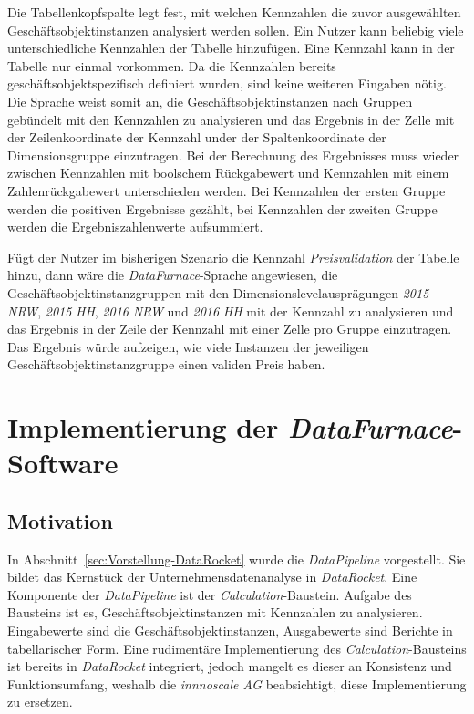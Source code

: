 \documentclass[
  language=german, %
  type=bachelor%
]{isthesis}
\begin{document}
\begin{content}
  Die Tabellenkopfspalte legt fest, mit welchen Kennzahlen die zuvor
  ausgewählten Geschäftsobjektinstanzen analysiert werden sollen. Ein Nutzer
  kann beliebig viele unterschiedliche Kennzahlen der Tabelle hinzufügen. Eine
  Kennzahl kann in der Tabelle nur einmal vorkommen. Da die Kennzahlen bereits
  geschäftsobjektspezifisch definiert wurden, sind keine weiteren Eingaben
  nötig. Die Sprache weist somit an, die Geschäftsobjektinstanzen nach Gruppen
  gebündelt mit den Kennzahlen zu analysieren und das Ergebnis in der Zelle mit
  der Zeilenkoordinate der Kennzahl under der Spaltenkoordinate der
  Dimensionsgruppe einzutragen. Bei der Berechnung des Ergebnisses muss wieder
  zwischen Kennzahlen mit boolschem Rückgabewert und Kennzahlen mit einem
  Zahlenrückgabewert unterschieden werden. Bei Kennzahlen der ersten
  Gruppe werden die positiven Ergebnisse gezählt, bei Kennzahlen der zweiten
  Gruppe werden die Ergebniszahlenwerte aufsummiert.
  
  Fügt der Nutzer im bisherigen Szenario die
  Kennzahl \textit{Preisvalidation} der Tabelle hinzu, dann wäre die
  \textit{DataFurnace}-Sprache angewiesen, die Geschäftsobjektinstanzgruppen
  mit den Dimensionslevelausprägungen \textit{2015} \textit{NRW}, \textit{2015}
  \textit{HH}, \textit{2016} \textit{NRW} und \textit{2016} \textit{HH} mit der
  Kennzahl zu analysieren und das Ergebnis in der Zeile der Kennzahl mit einer
  Zelle pro Gruppe einzutragen. Das Ergebnis würde aufzeigen, wie viele Instanzen der
  jeweiligen Geschäftsobjektinstanzgruppe einen validen Preis haben.



  \chapter{Implementierung der \textit{DataFurnace}-Software}

  \section{Motivation}
  In Abschnitt~\ref{sec:Vorstellung-DataRocket} wurde die \textit{DataPipeline}
  vorgestellt. Sie bildet das Kernstück der Unternehmensdatenanalyse in
  \textit{DataRocket}. Eine Komponente der \textit{DataPipeline} ist der
  \textit{Calculation}-Baustein.  Aufgabe des Bausteins ist es,
  Geschäftsobjektinstanzen mit Kennzahlen zu analysieren. Eingabewerte sind die
  Geschäftsobjektinstanzen, Ausgabewerte sind Berichte in tabellarischer Form.
  Eine rudimentäre Implementierung des \textit{Calculation}-Bausteins ist
  bereits in \textit{DataRocket} integriert, jedoch mangelt es dieser an
  Konsistenz und Funktionsumfang, weshalb die \textit{innnoscale AG}
  beabsichtigt, diese Implementierung zu ersetzen.


\end{content}
\end{document}
